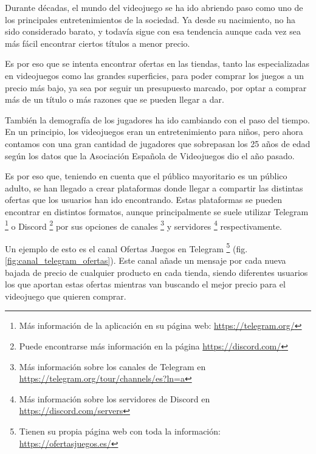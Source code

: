 
Durante décadas, el mundo del videojuego se ha ido abriendo paso como uno de los principales entretenimientos de la sociedad. Ya desde su nacimiento, 
no ha sido considerado barato, y todavía sigue con esa tendencia aunque cada vez sea más fácil encontrar ciertos títulos a menor precio.

Es por eso que se intenta encontrar ofertas en las tiendas, tanto las especializadas en videojuegos como las grandes superficies, para poder comprar 
los juegos a un precio más bajo, ya sea por seguir un presupuesto marcado, por optar a comprar más de un título o más razones que se pueden llegar a 
dar.

También la demografía de los jugadores ha ido cambiando con el paso del tiempo. En un principio, los videojuegos eran un entretenimiento para niños, pero 
ahora contamos con una gran cantidad de jugadores que sobrepasan los 25 años de edad según los datos que la Asociación Española de Videojuegos \cite{aevi} 
dio el año pasado.

Es por eso que, teniendo en cuenta que el público mayoritario es un público adulto, se han llegado a crear plataformas donde llegar a compartir las 
distintas ofertas que los usuarios han ido encontrando. Estas plataformas se pueden encontrar en distintos formatos, aunque principalmente se suele 
utilizar Telegram \footnote{Más información de la aplicación en su página web: \url{https://telegram.org/}} o Discord \footnote{Puede encontrarse más 
información en la página \url{https://discord.com/}} por sus opciones de canales \footnote{Más información sobre los canales de Telegram en 
\url{https://telegram.org/tour/channels/es?ln=a}} y servidores \footnote{Más información sobre los servidores de Discord en 
\url{https://discord.com/servers}} respectivamente.

Un ejemplo de esto es el canal Ofertas Juegos en Telegram \footnote{Tienen su propia página web con toda la información: \url{https://ofertasjuegos.es/}} 
(fig. \ref{fig:canal_telegram_ofertas}). Este canal añade un mensaje por cada nueva bajada de precio de cualquier producto en cada tienda, siendo 
diferentes usuarios los que aportan estas ofertas mientras van buscando el mejor precio para el videojuego que quieren comprar.

